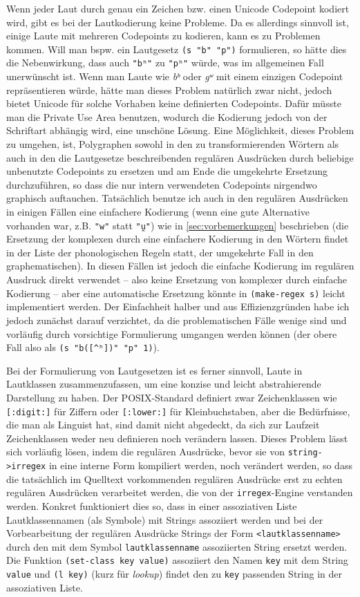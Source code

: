 \documentclass[12pt,a4paper,normalheadings,bibliography=totoc]{scrartcl}
\def\bel#1{\mbox{\textit{#1}}}
\def\tt#1{\texttt{#1}}
\def\str#1{\texttt{"#1"}}
\begin{document}
Wenn jeder Laut durch genau ein Zeichen bzw. einen Unicode Codepoint kodiert wird,
gibt es bei der Lautkodierung keine Probleme.
Da es allerdings sinnvoll ist,
einige Laute mit mehreren Codepoints zu kodieren,
kann es zu Problemen kommen.
Will man bspw. ein Lautgesetz \tt{(s "b" "p")} formulieren,
so hätte dies die Nebenwirkung,
dass auch \str{bʰ} zu \str{pʰ} würde,
was im allgemeinen Fall unerwünscht ist.
Wenn man Laute wie \bel{bʰ} oder \bel{gʷ} mit einem einzigen Codepoint
repräsentieren würde,
hätte man dieses Problem natürlich zwar nicht,
jedoch bietet Unicode für solche Vorhaben keine definierten Codepoints.
Dafür müsste man die Private Use Area benutzen,
wodurch die Kodierung jedoch von der Schriftart abhängig wird,
eine unschöne Lösung.
Eine Möglichkeit, dieses Problem zu umgehen, ist,
Polygraphen sowohl in den zu transformierenden Wörtern als auch in den
die Lautgesetze beschreibenden regulären Ausdrücken durch
beliebige unbenutzte Codepoints zu ersetzen
und am Ende die umgekehrte Ersetzung durchzuführen,
so dass die nur intern verwendeten Codepoints nirgendwo graphisch auftauchen.
Tatsächlich benutze ich auch in den regulären Ausdrücken
in einigen Fällen eine einfachere Kodierung
(wenn eine gute Alternative vorhanden war, z.B. \str{w} statt \str{u̯}) wie in
\ref{sec:vorbemerkungen} beschrieben
(die Ersetzung der komplexen durch eine einfachere Kodierung in den Wörtern
findet in der Liste der phonologischen Regeln statt,
der umgekehrte Fall in den graphematischen).
In diesen Fällen ist jedoch die einfache Kodierung
im regulären Ausdruck direkt verwendet --
also keine Ersetzung von komplexer durch einfache Kodierung --
aber eine automatische Ersetzung könnte in \tt{(make-regex s)}
leicht implementiert werden.
Der Einfachheit halber und aus Effizienzgründen habe ich jedoch zunächst
darauf verzichtet,
da die problematischen Fälle wenige sind und vorläufig durch vorsichtige
Formulierung umgangen werden können
(der obere Fall also als \tt{(s "b([\textasciicircum{}ʰ])" "p" 1)}).

Bei der Formulierung von Lautgesetzen ist es ferner sinnvoll,
Laute in Lautklassen zusammenzufassen,
um eine konzise und leicht abstrahierende Darstellung zu haben.
Der POSIX-Standard definiert zwar Zeichenklassen wie \tt{[:digit:]}
für Ziffern oder \tt{[:lower:]} für Kleinbuchstaben,
aber die Bedürfnisse, die man als Linguist hat,
sind damit nicht abgedeckt,
da sich zur Laufzeit Zeichenklassen weder neu definieren noch verändern lassen.
Dieses Problem lässt sich vorläufig lösen,
indem die regulären Ausdrücke,
bevor sie von \tt{string->irregex} in eine interne Form kompiliert werden,
noch verändert werden,
so dass die tatsächlich im Quelltext vorkommenden regulären Ausdrücke
erst zu echten regulären Ausdrücken verarbeitet werden,
die von der \tt{irregex}-Engine verstanden werden.
Konkret funktioniert dies so,
dass in einer assoziativen Liste Lautklassennamen (als Symbole)
mit Strings assoziiert werden
und bei der Vorbearbeitung der regulären Ausdrücke
Strings der Form \tt{<lautklassenname>} durch den mit dem Symbol
\tt{lautklassenname} assoziierten String ersetzt werden.
Die Funktion \tt{(set-class key value)} assoziiert den Namen \tt{key}
mit dem String \tt{value} und \tt{(l key)} (kurz für \emph{lookup})
findet den zu \tt{key} passenden String in der assoziativen Liste.
\end{document}
